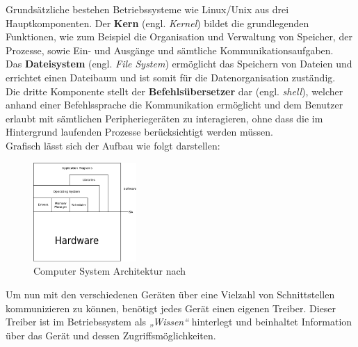 Grundsätzliche bestehen Betriebssysteme wie Linux/Unix aus drei Hauptkomponenten.
Der \textbf{Kern} (engl. \emph{Kernel}) bildet die grundlegenden Funktionen, wie
zum Beispiel die Organisation und Verwaltung von Speicher, der Prozesse, sowie
Ein- und Ausgänge und sämtliche Kommunikationsaufgaben.\\
Das \textbf{Dateisystem} (engl. \emph{File System}) ermöglicht das Speichern von Dateien
und errichtet einen Dateibaum und ist somit für die Datenorganisation zuständig.\\
Die dritte Komponente stellt der \textbf{Befehlsübersetzer} dar (engl. \emph{shell}),
welcher anhand einer Befehlssprache die Kommunikation ermöglicht und dem Benutzer erlaubt
mit sämtlichen Peripheriegeräten zu interagieren, ohne dass die im Hintergrund laufenden
Prozesse berücksichtigt werden müssen.~\cite{ubuntu}\\

Grafisch lässt sich der Aufbau wie folgt darstellen:\\

\begin{figure}[H]
\centering
\includegraphics[width=0.35\textwidth]{Hauptteil/csa.eps}
\caption{Computer System Architektur nach~\cite{virtualmachines}}
\label{fig:mbs}
\end{figure}

Um nun mit den verschiedenen Geräten über eine Vielzahl von Schnittstellen kommunizieren
zu können, benötigt jedes Gerät einen eigenen Treiber. Dieser Treiber ist im Betriebssystem
als \emph{„Wissen“} hinterlegt und beinhaltet Information über das Gerät und dessen
Zugriffsmöglichkeiten.~\cite{treiber}\\

